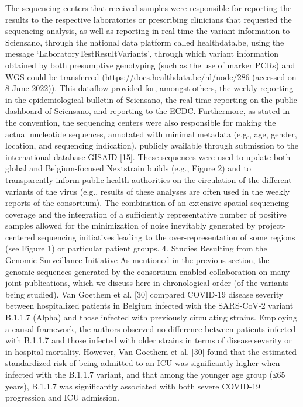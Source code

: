 The sequencing centers that received samples were responsible for reporting the results to the respective laboratories or prescribing clinicians that requested the sequencing analysis, as well as reporting in real-time the variant information to Sciensano, through the national data platform called healthdata.be, using the message ‘LaboratoryTestResultVariants’, through which variant information obtained by both presumptive genotyping (such as the use of marker PCRs) and WGS could be transferred (https://docs.healthdata.be/nl/node/286 (accessed on 8 June 2022)). This dataflow provided for, amongst others, the weekly reporting in the epidemiological bulletin of Sciensano, the real-time reporting on the public dashboard of Sciensano, and reporting to the ECDC. Furthermore, as stated in the convention, the sequencing centers were also responsible for making the actual nucleotide sequences, annotated with minimal metadata (e.g., age, gender, location, and sequencing indication), publicly available through submission to the international database GISAID [15]. These sequences were used to update both global and Belgium-focused Nextstrain builds (e.g., Figure 2) and to transparently inform public health authorities on the circulation of the different variants of the virus (e.g., results of these analyses are often used in the weekly reports of the consortium). The combination of an extensive spatial sequencing coverage and the integration of a sufficiently representative number of positive samples allowed for the minimization of noise inevitably generated by project-centered sequencing initiatives leading to the over-representation of some regions (see Figure 1) or particular patient groups.
4. Studies Resulting from the Genomic Surveillance Initiative
As mentioned in the previous section, the genomic sequences generated by the consortium enabled collaboration on many joint publications, which we discuss here in chronological order (of the variants being studied).
Van Goethem et al. [30] compared COVID-19 disease severity between hospitalized patients in Belgium infected with the SARS-CoV-2 variant B.1.1.7 (Alpha) and those infected with previously circulating strains. Employing a causal framework, the authors observed no difference between patients infected with B.1.1.7 and those infected with older strains in terms of disease severity or in-hospital mortality. However, Van Goethem et al. [30] found that the estimated standardized risk of being admitted to an ICU was significantly higher when infected with the B.1.1.7 variant, and that among the younger age group (≤65 years), B.1.1.7 was significantly associated with both severe COVID-19 progression and ICU admission.
